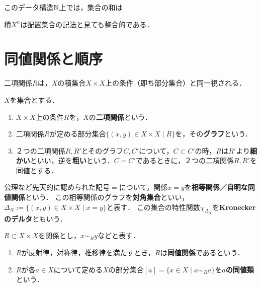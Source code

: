 \documentclass[uplatex, 12pt, dvipdfmx]{jsreport}
\begin{document}
\begin{remark}
    このデータ構造$\mathbb{N}$上では，集合の和は

    積$X^n$は配置集合の記法と見ても整合的である．
\end{remark}

\section{同値関係と順序}

\begin{screen}
    二項関係$R$は，$X$の積集合$X\times X$上の条件（即ち部分集合）と同一視される．
\end{screen}

\begin{definition}
    $X$を集合とする．
    \begin{enumerate}
        \item $X\times X$上の条件$R$を，$X$の\textbf{二項関係}という．
        \item 二項関係$R$が定める部分集合$\{(x,y)\in X\times X\mid R\}$を，その\textbf{グラフ}という．
        \item ２つの二項関係$R,R'$とそのグラフ$C,C'$について，$C\subset C'$の時，$R$は$R'$より\textbf{細かい}といい，逆を\textbf{粗い}という．$C=C'$であるときに，２つの二項関係$R,R'$を同値とする．
    \end{enumerate}
\end{definition}

\begin{example}
    公理など先天的に認められた記号$=$について，関係$x=y$を\textbf{相等関係／自明な同値関係}という．
    この相等関係のグラフを\textbf{対角集合}といい，$\Delta_X:=\{(x,y)\in X\times X\mid x=y\}$と表す．
    この集合の特性関数$\chi_{\Delta_X}$を\textbf{Kroneckerのデルタ}ともいう．
\end{example}

\begin{definition}
    $R\subset X\times X$を関係とし，$x\sim_R y$などと表す．
    \begin{enumerate}
        \item $R$が反射律，対称律，推移律を満たすとき，$R$は\textbf{同値関係}であるという．
        \item $R$が各$a\in X$について定める$X$の部分集合$[a]=\{x\in X\mid x\sim_Ra\}$を\textbf{$a$の同値類}という．
    \end{enumerate}
\end{definition}
\end{document}
